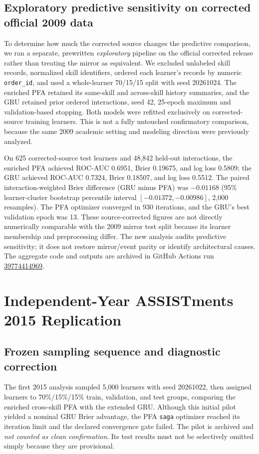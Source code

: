 \documentclass[11pt,a4paper]{article}
\begin{document}
\subsection{Exploratory predictive sensitivity on corrected official 2009 data}
To determine how much the corrected source changes the predictive comparison, we ran a separate, prewritten \emph{exploratory} pipeline on the official corrected release rather than treating the mirror as equivalent. We excluded unlabeled skill records, normalized skill identifiers, ordered each learner's records by numeric \texttt{order\_id}, and used a whole-learner 70/15/15 split with seed 20261024. The enriched PFA retained its same-skill and across-skill history summaries, and the GRU retained prior ordered interactions, seed 42, 25-epoch maximum and validation-based stopping. Both models were refitted exclusively on corrected-source training learners. This is not a fully untouched confirmatory comparison, because the same 2009 academic setting and modeling direction were previously analyzed.

On 625 corrected-source test learners and 48,842 held-out interactions, the enriched PFA achieved ROC-AUC 0.6951, Brier 0.19675, and log loss 0.5809; the GRU achieved ROC-AUC 0.7324, Brier 0.18507, and log loss 0.5512. The paired interaction-weighted Brier difference (GRU minus PFA) was $-0.01168$ (95\% learner-cluster bootstrap percentile interval $[-0.01372,-0.00986]$, 2,000 resamples). The PFA optimizer converged in 930 iterations, and the GRU's best validation epoch was 13. These source-corrected figures are not directly numerically comparable with the 2009 mirror test split because its learner membership and preprocessing differ. The new analysis audits predictive sensitivity; it does not restore mirror/event parity or identify architectural causes. The aggregate code and outputs are archived in GitHub Actions run \href{https://github.com/devissaputra/knowledge_tracing_benchmark/actions/runs/39774414969}{39774414969}.

\section{Independent-Year ASSISTments 2015 Replication}
\subsection{Frozen sampling sequence and diagnostic correction}
The first 2015 analysis sampled 5,000 learners with seed 20261022, then assigned learners to 70\%/15\%/15\% train, validation, and test groups, comparing the enriched cross-skill PFA with the extended GRU. Although this initial pilot yielded a nominal GRU Brier advantage, the PFA \texttt{saga} optimizer reached its iteration limit and the declared convergence gate failed. The pilot is archived and \emph{not counted as clean confirmation}. Its test results must not be selectively omitted simply because they are provisional.
\end{document}
